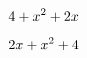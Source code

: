 \documentclass[10pt,a4paper]{article}
\newcommand{\parteAtriSecabc}[1]{\ifnumequal{#1}{0}{\message{a=0}\stop}%
	{\ifnumcomp{#1}{>}{0}{\ifnumequal{#1}{1}
		{x^{2}}{#1x^{2}}}%
	{\ifnumequal{#1}{-1}{-x^{2}}{#1x^{2}}}}}
\newcommand{\parteBtriSecabc}[1]{%
\ifnumequal{#1}{0}{}{\ifnumgreater{#1}{0}{\ifnumequal{#1}{1}{+x}{+#1x}}
	{\ifnumequal{#1}{-1}{-x}{#1x}}}%
}
\newcommand{\parteCtriSecabc}[1]{%
\ifnumequal{#1}{0}{}{\ifnumgreater{#1}{0}{+#1}{#1}}%
}
\newcommand{\parteAtriSecbac}[1]{\ifnumequal{#1}{0}{\message{a=0}\stop}%
	{\ifnumcomp{#1}{>}{0}{\ifnumequal{#1}{1}
			{+x^{2}}{+#1x^{2}}}%
		{\ifnumequal{#1}{-1}{-x^{2}}{#1x^{2}}}}}
\newcommand{\parteBtriSecbac}[1]{%
		\ifnumequal{#1}{0}{}{\ifnumgreater{#1}{0}{\ifnumequal{#1}{1}{x}{#1x}}
			{\ifnumequal{#1}{-1}{-x}{#1x}}}%
	}
\newcommand{\parteCtriSeccab}[1]{%
	\ifnumequal{#1}{0}{}{\ifnumgreater{#1}{0}{#1}{#1}}%
}
\newcommand{\newtrinomio}[4]{
\ifcase #4
\parteAtriSecabc{#1}\parteBtriSecabc{#2}\parteCtriSecabc{#3}%
\or
\parteAtriSecabc{#1}\parteCtriSecabc{#3}\parteBtriSecabc{#2}%
\or
\parteBtriSecbac{#2}\parteAtriSecbac{#1}\parteCtriSecabc{#3}%
\or
\parteBtriSecbac{#2}\parteCtriSecabc{#3}\parteAtriSecbac{#1}%
\or
\parteCtriSeccab{#3}\parteAtriSecbac{#1}\parteBtriSecabc{#2}%
\or
\parteCtriSeccab{#3}\parteBtriSecabc{#2}\parteAtriSecbac{#1}%
\fi
}
\begin{document}
	\[\newtrinomio{1}{2}{4}{4}\]
	
	\[\newtrinomio{1}{2}{4}{2}\]
\end{document}
